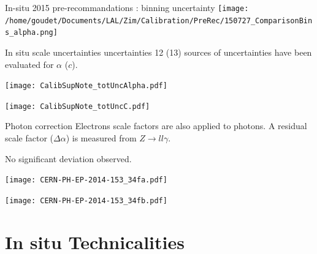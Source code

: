 \begin{frame}{In-situ 2015 pre-recommandations : binning uncertainty}
  \centering
  \texttt{[image: /home/goudet/Documents/LAL/Zim/Calibration/PreRec/150727\_ComparisonBins\_alpha.png]}
  \end{frame}
\begin{frame}{In situ scale uncertainties uncertainties}
  12 (13) sources of uncertainties have been evaluated for $\alpha$ ($c$).

    \begin{minipage}{0.49\linewidth} 
      \texttt{[image: CalibSupNote\_totUncAlpha.pdf]}
  \end{minipage}
  \hfill
  \begin{minipage}{0.49\linewidth}
    \texttt{[image: CalibSupNote\_totUncC.pdf]}
  \end{minipage}

\end{frame}

\begin{frame}{Photon correction}
Electrons scale factors are also applied to photons. 
A residual scale factor ($\Delta\alpha$) is measured from $Z\rightarrow ll\gamma$.

No significant deviation observed.
\newline
  \begin{minipage}{0.49\linewidth}
    \texttt{[image: CERN-PH-EP-2014-153\_34fa.pdf]}
  \end{minipage}
  \hfill
  \begin{minipage}{0.49\linewidth}
    \texttt{[image: CERN-PH-EP-2014-153\_34fb.pdf]}
  \end{minipage}
\end{frame}


\section{In situ Technicalities}



